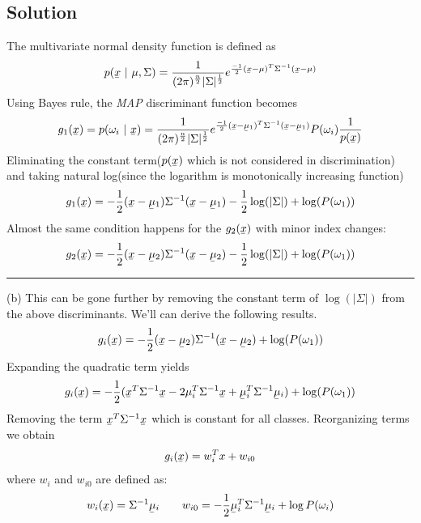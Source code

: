 \documentclass[12pt]{article}
\numberwithin{equation}{section}
\numberwithin{table}{section}
\numberwithin{figure}{section}
\begin{document}
\subsection*{Solution}
The multivariate normal density function is defined as
\begin{equation}\label{eq:6.1}
	p(\underaccent{\bar}{x}\ |\ \mu, \Sigma) = \frac{1}{(2\pi)^\frac{n}{2}|\Sigma|^\frac{1}{2}} e^{\frac{-1}{2}(\underaccent{\bar}{x} - \mu)^T\Sigma^{-1}(\underaccent{\bar}{x} - \mu)} 
\end{equation}
Using Bayes rule, the \textit{MAP} discriminant function becomes
$$
	g_1(\underaccent{\bar}{x}) = p(\omega_i\ |\ \underaccent{\bar}{x}) = \frac{1}{(2\pi)^\frac{n}{2}|\Sigma|^\frac{1}{2}} e^{\frac{-1}{2}(\underaccent{\bar}{x} - \underaccent{\bar}{\mu}_1)^T\Sigma^{-1}(\underaccent{\bar}{x} - \underaccent{\bar}{\mu}_1)}P(\omega_i)\frac{1}{p(\underaccent{\bar}{x})}
$$
Eliminating the constant term($p(\underaccent{\bar}{x})$ which is not considered in discrimination) and taking natural log(since the logarithm is monotonically increasing function)
$$
	g_1(\underaccent{\bar}{x}) = -\frac{1}{2}(\underaccent{\bar}{x}-\underaccent{\bar}{\mu}_1)\Sigma^{-1}(\underaccent{\bar}{x} - \underaccent{\bar}{\mu}_1) - \frac{1}{2}\log(|\Sigma|) + \log(P(\omega_1))
$$
Almost the same condition happens for the $g_2(\underaccent{\bar}{x})$ with minor index changes:
$$
	g_2(\underaccent{\bar}{x}) = -\frac{1}{2}(\underaccent{\bar}{x}-\underaccent{\bar}{\mu}_2)\Sigma^{-1}(\underaccent{\bar}{x} - \underaccent{\bar}{\mu}_2) - \frac{1}{2}\log(|\Sigma|) + \log(P(\omega_1))
$$
\noindent\rule{\textwidth}{.5pt}
(b) This can be gone further by removing the constant term of $\log(|\Sigma|)$ from the above discriminants. We'll can derive the following results.
$$
		g_i(\underaccent{\bar}{x}) = -\frac{1}{2}(\underaccent{\bar}{x}-\underaccent{\bar}{\mu}_2)\Sigma^{-1}(\underaccent{\bar}{x} - \underaccent{\bar}{\mu}_2) + \log(P(\omega_1))
$$
Expanding the quadratic term yields
$$
		g_i(\underaccent{\bar}{x}) = -\frac{1}{2}(\underaccent{\bar}{x}^T\Sigma^{-1} \underaccent{\bar}{x} - 2\mu_i^T\Sigma^{-1}\underaccent{\bar}{x}  + \underaccent{\bar}{\mu}_i^{T}\Sigma^{-1}\underaccent{\bar}{\mu}_i) + \log(P(\omega_1))
$$
Removing the term $\underaccent{\bar}{x}^T\Sigma^{-1}\underaccent{\bar}{x}$ which is constant for all classes. Reorganizing terms we obtain 
\begin{equation}
	g_i(\underaccent{\bar}{x}) = w_i^Tx + w_{i0}
\end{equation}
where $w_i$ and $w_{i0}$ are defined as:
$$
	w_i(\underaccent{\bar}{x}) = \Sigma^{-1}\underaccent{\bar}{\mu}_i \ \ \ \ \ \ 
	w_{i0} = -\frac{1}{2}\underaccent{\bar}{\mu}_i^{T}\Sigma^{-1}\underaccent{\bar}{\mu}_i + \log P(\omega_i)
$$
\end{document}
